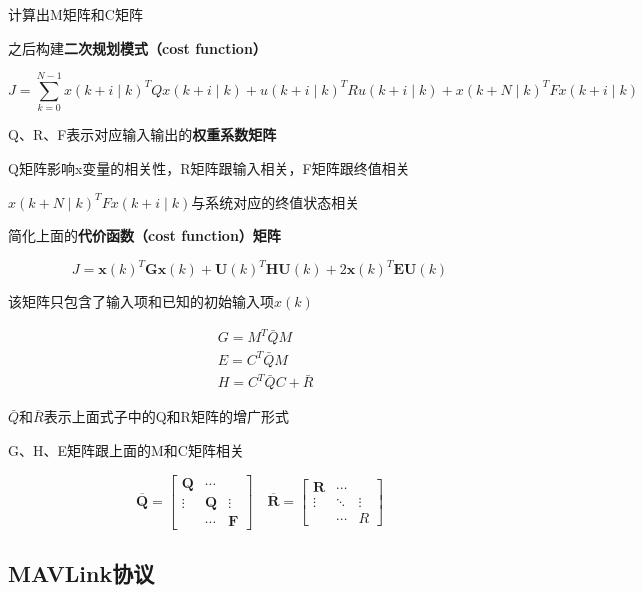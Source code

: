 计算出M矩阵和C矩阵

之后构建\textbf{二次规划模式（cost function）}\cite{ArtE7}

\begin{equation}
J=\sum_{k=0}^{N-1} x(k+i \mid k)^{T} Q x(k+i \mid k)+u(k+i \mid k)^{T} R u(k+i \mid k)+x(k+N \mid k)^{T} F x(k+i \mid k)
\end{equation}

Q、R、F表示对应输入输出的\textbf{权重系数矩阵}

Q矩阵影响x变量的相关性，R矩阵跟输入相关，F矩阵跟终值相关

$x(k+N \mid k)^{T} F x(k+i \mid k)$与系统对应的终值状态相关

简化上面的\textbf{代价函数（cost function）矩阵}

\begin{equation}
J=\boldsymbol{x}(k)^{T} \boldsymbol{G} \boldsymbol{x}(k)+\boldsymbol{U}(k)^{T} \boldsymbol{H} \boldsymbol{U}(k)+2 \boldsymbol{x}(k)^{T} \boldsymbol{E} \boldsymbol{U}(k)
\end{equation}

该矩阵只包含了输入项和已知的初始输入项$x(k)$

\begin{equation}
\begin{aligned}&G=M^{T} \bar{Q} M \\&E=C^{T} \bar{Q} M \\&H=C^{T} \bar{Q} C+\bar{R}\end{aligned}
\end{equation}

$\bar{Q}$和$\bar{R}$表示上面式子中的Q和R矩阵的增广形式

G、H、E矩阵跟上面的M和C矩阵相关

\begin{equation}
\overline{\boldsymbol{Q}}=\left[\begin{array}{ccc}\boldsymbol{Q} & \cdots & \\\vdots & \boldsymbol{Q} & \vdots \\& \cdots & \boldsymbol{F}\end{array}\right] \quad \overline{\boldsymbol{R}}=\left[\begin{array}{ccc}\boldsymbol{R} & \cdots & \\\vdots & \ddots & \vdots \\& \cdots & R\end{array}\right]
\end{equation}

\subsection{MAVLink协议}


